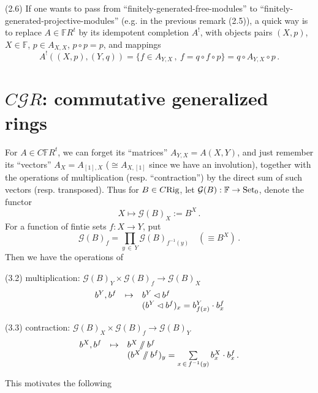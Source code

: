 \documentclass[leqno]{article}
\numberwithin{equation}{section}
\begin{document}
\bigskip

\noindent (2.6)  If one wants to pass from ``finitely-generated-free-modules'' to ``finitely-generated-projective-modules'' (e.g. in the previous remark (2.5)), a quick way is to replace $A \in {\mathbb F} R^t$ by its idempotent completion $A^!$, with objects pairs $(X,p)$, $X \in {\mathbb F}$, $p \in A_{X,X}$, $p \circ p = p$, and mappings
$$
A^! ((X,p) , (Y,q)) = \{ f \in A_{Y,X} \, , \ f = q \circ f \circ p \} = q \circ A_{Y,X} \circ p \, .
$$


\section{$C {\mathcal G} R$: commutative generalized rings}

For $A \in C{\mathbb F} R^t$, we can forget its ``matrices'' $A_{Y,X} = A(X,Y)$, and just remember its ``vectors'' $A_X = A_{[1],X}$ ($\cong A_{X,[1]}$ since we have an involution), together with the operations of multiplication (resp. ``contraction'') by the direct sum of such vectors (resp. transposed). Thus for $B \in C{\rm Rig}$, let ${\mathcal G} (B) : {\mathbb F} \to {\rm Set}_0$, denote the functor
\begin{equation}
\label{eq31}
X \mapsto {\mathcal G} (B)_X := B^X \, .
\end{equation}
For a function of fintie sets $f : X \to Y$, put
$$
{\mathcal G} (B)_f = \prod_{y \, \in \, Y} {\mathcal G} (B)_{f^{-1} (y)} \quad (\equiv B^X) \, .
$$
Then we have the operations of

\bigskip

\noindent (3.2) \quad multiplication: ${\mathcal G}  (B)_Y \times {\mathcal G} (B)_f \to {\mathcal G} (B)_X$
$$
\begin{matrix}
b^Y , b^f &\mapsto &b^Y \lhd b^f \hfill \\
&&(b^Y \lhd b^f)_x = b_{f(x)}^Y \cdot b_x^f
\end{matrix}
$$

\noindent (3.3) \quad contraction: ${\mathcal G}  (B)_X \times {\mathcal G} (B)_f \to {\mathcal G} (B)_Y$
$$
\begin{matrix}
b^X , b^f &\mapsto &b^X \sslash b^f \hfill \\
&&(b^X \sslash b^f)_y = \underset{x \, \in \, f^{-1} (y)}{\sum} \, b_x^X \cdot b_x^f \, .
\end{matrix}
$$

This motivates the following

\bigskip
\end{document}

